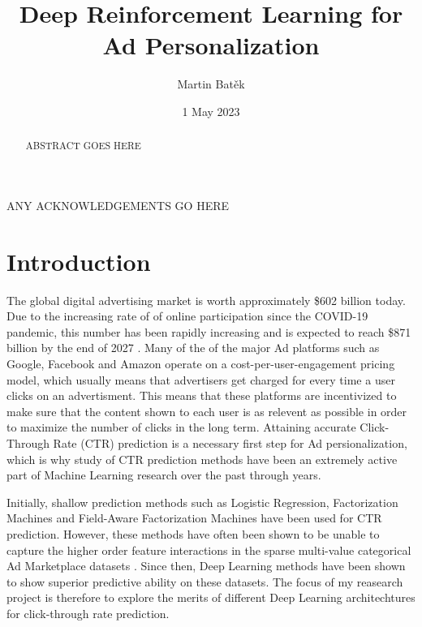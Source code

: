 \documentclass{mldsmsc}
\title{Deep Reinforcement Learning for Ad Personalization}
\author{Martin Bat\v{e}k}
\date{1 May 2023}
\begin{document}
\maketitle


\declaration 


\begin{abstract}
    ABSTRACT GOES HERE
\end{abstract}

\begin{acknowledgements}
    ANY ACKNOWLEDGEMENTS GO HERE
\end{acknowledgements}


\tableofcontents

\mainmatter


\chapter{Introduction}

The global digital advertising market is worth approximately \$602 billion today. Due to the increasing rate of of online participation since the 
COVID-19 pandemic, this number has been rapidly increasing and is expected to reach \$871 billion by the end of 2027 \citep{RefWorks:emarketer2023digital}.
Many of the of the major Ad platforms such as Google, Facebook and Amazon operate on a cost-per-user-engagement pricing model, which usually means that 
advertisers get charged for every time a user clicks on an advertisment. This means that these platforms are incentivized to make sure that the content 
shown to each user is as relevent as possible in order to maximize the number of clicks in the long term. Attaining accurate Click-Through Rate (CTR) 
prediction is a necessary first step for Ad persionalization, which is why study of CTR prediction methods have been an extremely active part of 
Machine Learning research over the past through years.

Initially, shallow prediction methods such as Logistic Regression, Factorization Machines \citep{RefWorks:rendle2010factorization} and Field-Aware Factorization 
Machines \citep{RefWorks:juan2016field-aware} have been used for CTR prediction. However, these methods have often been shown to be unable to capture the 
higher order feature interactions in the sparse multi-value categorical Ad Marketplace datasets \citep{RefWorks:zhang2021deep}. Since then, Deep Learning methods have been 
shown to show superior predictive ability on these datasets. The focus of my reasearch project is therefore to explore the merits of different Deep 
Learning architechtures for click-through rate prediction.
\end{document}

